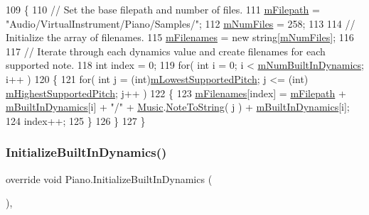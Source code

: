 \begin{DoxyCode}
109     \{
110         \textcolor{comment}{// Set the base filepath and number of files.}
111         \hyperlink{group___v_i_base_pro_var_gac428224be859933d720a9c533fdb5643}{mFilepath} = \textcolor{stringliteral}{"Audio/VirtualInstrument/Piano/Samples/"};
112         \hyperlink{group___v_i_base_pro_var_ga9a602db8c9833ce75d95dd453c27d341}{mNumFiles} = 258;
113 
114         \textcolor{comment}{// Initialize the array of filenames.}
115         \hyperlink{group___v_i_base_pro_var_gab2add474ca506357688b5dd08cac4cb5}{mFilenames} = \textcolor{keyword}{new} \textcolor{keywordtype}{string}[\hyperlink{group___v_i_base_pro_var_ga9a602db8c9833ce75d95dd453c27d341}{mNumFiles}];
116 
117         \textcolor{comment}{// Iterate through each dynamics value and create filenames for each supported note.}
118         \textcolor{keywordtype}{int} index = 0;
119         \textcolor{keywordflow}{for}( \textcolor{keywordtype}{int} i = 0; i < \hyperlink{group___v_i_base_pro_var_gac265f64f759d267ee1e1680f8d387011}{mNumBuiltInDynamics}; i++ )
120         \{
121             \textcolor{keywordflow}{for}( \textcolor{keywordtype}{int} j = (\textcolor{keywordtype}{int})\hyperlink{group___v_i_base_pro_var_ga3cae52b1bcc0178a8a6b03c7aaf7aac8}{mLowestSupportedPitch}; j <= (int)
      \hyperlink{group___v_i_base_pro_var_ga61fb2c33b53a0f663047779d7ceb18f3}{mHighestSupportedPitch}; j++ )
122             \{
123                 \hyperlink{group___v_i_base_pro_var_gab2add474ca506357688b5dd08cac4cb5}{mFilenames}[index] = \hyperlink{group___v_i_base_pro_var_gac428224be859933d720a9c533fdb5643}{mFilepath} + 
      \hyperlink{group___v_i_base_pro_var_ga87961e72f25fbc2256b614a394aa6f13}{mBuiltInDynamics}[i] + \textcolor{stringliteral}{"/"} + \hyperlink{class_music}{Music}.\hyperlink{group___music_stat_func_ga85a22c905d56d4c5f4e62159bfecee8c}{NoteToString}( j ) + 
      \hyperlink{group___v_i_base_pro_var_ga87961e72f25fbc2256b614a394aa6f13}{mBuiltInDynamics}[i];
124                 index++;
125             \}
126         \}
127     \}
\end{DoxyCode}
\mbox{\label{group___piano_virt_ga6bc02528f8808b8a30aa7d5776445a6d}} 
\subsubsection{\texorpdfstring{Initialize\+Built\+In\+Dynamics()}{InitializeBuiltInDynamics()}}
{\footnotesize\ttfamily override void Piano.\+Initialize\+Built\+In\+Dynamics (\begin{DoxyParamCaption}{ }\end{DoxyParamCaption})\hspace{0.3cm}{\ttfamily [protected]}, {\ttfamily [virtual]}}



